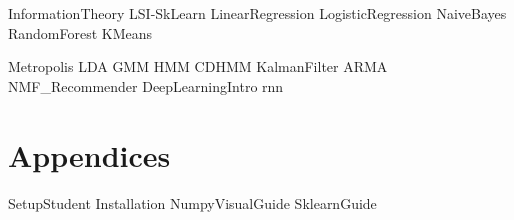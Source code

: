 \documentclass[opener-c,labs,yellow,nociteref]{HJnewsiambook}
\begin{document}
{InformationTheory}
{LSI-SkLearn}
{LinearRegression}
{LogisticRegression}
{NaiveBayes}
{RandomForest}
{KMeans}

{Metropolis}
{LDA}
{GMM}
{HMM}
{CDHMM}
{KalmanFilter}
{ARMA}
{NMF_Recommender}
{DeepLearningIntro}
{rnn}

\part{Appendices}
\begin{appendices}
{SetupStudent}
{Installation}
{NumpyVisualGuide}
{SklearnGuide}
\end{appendices}



\end{document}
